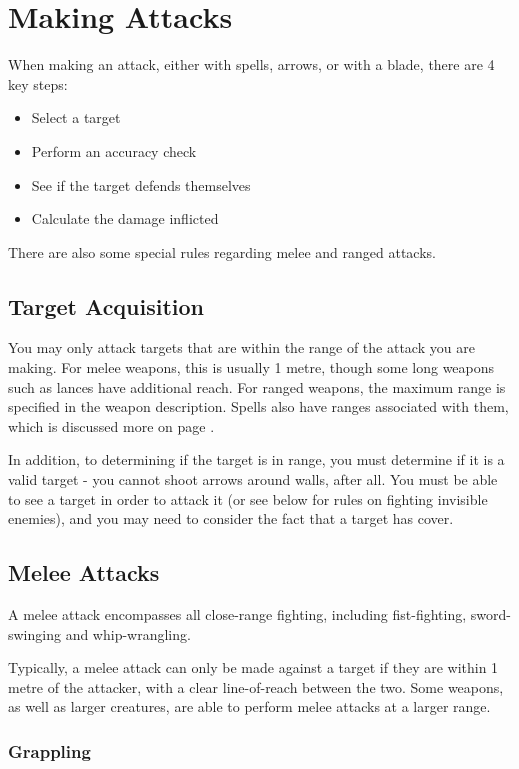 \newpage

\section{Making Attacks}\label{S:Attacks}

When making an attack, either with spells, arrows, or with a blade, there are 4 key steps:
\begin{itemize}
	\item Select a target 
	\item Perform an accuracy check 
	\item See if the target defends themselves
	\item Calculate the damage inflicted
\end{itemize}

There are also some special rules regarding melee and ranged attacks.
\subsection{Target Acquisition}

You may only attack targets that are within the range of the attack you are making. For melee weapons, this is usually 1 metre, though some long weapons such as lances have additional reach. For ranged weapons, the maximum range is specified in the weapon description. Spells also have ranges associated with them, which is discussed more on page \pageref{S:Range}. 

In addition, to determining if the target is in range, you must determine if it is a valid target - you cannot shoot arrows around walls, after all. You must be able to see a target in order to attack it (or see below for rules on fighting invisible enemies), and you may need to consider the fact that a target has cover. 


\subsection{Melee Attacks}

A melee attack encompasses all close-range fighting, including fist-fighting, sword-swinging and whip-wrangling. 

Typically, a melee attack can only be made against a target if they are within 1 metre of the attacker, with a clear line-of-reach between the two. Some weapons, as well as larger creatures, are able to perform melee attacks at a larger range.  

\subsubsection{Grappling}


